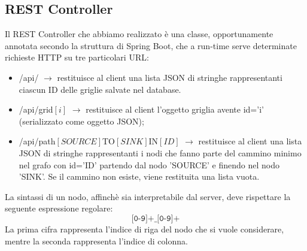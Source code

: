 \subsection{REST Controller}
Il REST Controller che abbiamo realizzato \`e una classe, opportunamente annotata secondo la struttura di Spring Boot, che a run-time serve determinate richieste HTTP su tre particolari URL:
\begin{itemize}
	\item /api/ $\rightarrow$ restituisce al client una lista JSON di stringhe rappresentanti ciascun ID delle griglie salvate nel database.
	\item /api/grid$[i]$ $\rightarrow$ restituisce al client l'oggetto griglia avente id='i'  (serializzato come oggetto JSON);
	\item /api/path$[SOURCE]$TO$[SINK]$IN$[ID]$ $\rightarrow$ restituisce al client una lista JSON di stringhe rappresentanti i nodi che fanno parte del cammino minimo nel grafo con id='ID' partendo dal nodo 'SOURCE' e finendo nel nodo 'SINK'. Se il cammino non esiste, viene restituita una lista vuota.
\end{itemize}
La sintassi di un nodo, affinch\`e sia interpretabile dal server, deve rispettare la seguente espressione regolare:
$$
\texttt{[0-9]+\_[0-9]+}
$$
La prima cifra rappresenta l'indice di riga del nodo che si vuole considerare, mentre la seconda rappresenta l'indice di colonna.
